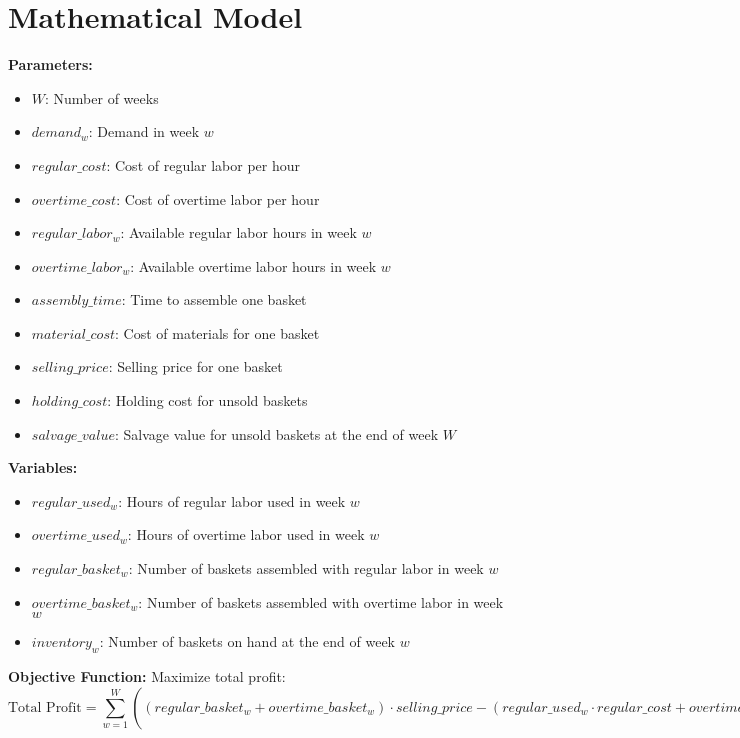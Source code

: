 \documentclass{article}
\begin{document}
\section*{Mathematical Model}

\textbf{Parameters:}
\begin{itemize}
    \item \( W \): Number of weeks
    \item \( demand_w \): Demand in week \( w \)
    \item \( regular\_cost \): Cost of regular labor per hour
    \item \( overtime\_cost \): Cost of overtime labor per hour
    \item \( regular\_labor_w \): Available regular labor hours in week \( w \)
    \item \( overtime\_labor_w \): Available overtime labor hours in week \( w \)
    \item \( assembly\_time \): Time to assemble one basket
    \item \( material\_cost \): Cost of materials for one basket
    \item \( selling\_price \): Selling price for one basket
    \item \( holding\_cost \): Holding cost for unsold baskets
    \item \( salvage\_value \): Salvage value for unsold baskets at the end of week \( W \)
\end{itemize}

\textbf{Variables:}
\begin{itemize}
    \item \( regular\_used_w \): Hours of regular labor used in week \( w \)
    \item \( overtime\_used_w \): Hours of overtime labor used in week \( w \)
    \item \( regular\_basket_w \): Number of baskets assembled with regular labor in week \( w \)
    \item \( overtime\_basket_w \): Number of baskets assembled with overtime labor in week \( w \)
    \item \( inventory_w \): Number of baskets on hand at the end of week \( w \)
\end{itemize}

\textbf{Objective Function:}
Maximize total profit:
\[
\text{Total Profit} = \sum_{w=1}^{W} \left( (regular\_basket_w + overtime\_basket_w) \cdot selling\_price - (regular\_used_w \cdot regular\_cost + overtime\_used_w \cdot overtime\_cost + regular\_basket_w \cdot material\_cost) - holding\_cost \cdot inventory_w - \begin{cases}
0 & \text{if } w < W \\
salvage\_value \cdot inventory_W & \text{if } w = W
\end{cases} \right)
\]
\end{document}
